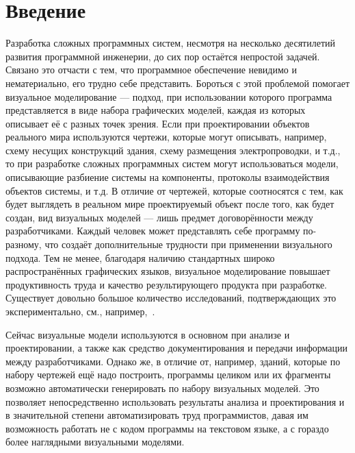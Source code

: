 \chapter*{Введение}
Разработка сложных программных систем, несмотря на несколько десятилетий 
развития программной инженерии, до сих пор остаётся непростой задачей. 
Связано это отчасти с тем, что программное обеспечение невидимо и нематериально, 
его трудно себе представить. Бороться с этой проблемой помогает визуальное 
моделирование --- подход, при использовании которого программа представляется в 
виде набора графических моделей, каждая из которых описывает её с разных точек 
зрения. Если при проектировании объектов реального мира используются чертежи, 
которые могут описывать, например, схему несущих конструкций здания, схему 
размещения электропроводки, и т.д., то при разработке сложных программных 
систем могут использоваться модели, описывающие разбиение системы на компоненты, 
протоколы взаимодействия объектов системы, и т.д. В отличие от чертежей, которые 
соотносятся с тем, как будет выглядеть в реальном мире проектируемый объект 
после того, как будет создан, вид визуальных моделей --- лишь предмет 
договорённости между разработчиками. Каждый человек может представлять себе 
программу по-разному, что создаёт дополнительные трудности при применении 
визуального подхода. Тем не менее, благодаря наличию стандартных широко 
распространённых графических языков, визуальное моделирование повышает 
продуктивность труда и качество результирующего продукта при разработке. 
Существует довольно большое количество исследований, подтверждающих это 
экспериментально, см., например,~\cite{heijstek2009empirical, baker2005model}.

Сейчас визуальные модели используются в основном при анализе и проектировании, 
а также как средство документирования и передачи информации между 
разработчиками. Однако же, в отличие от, например, зданий, которые по набору 
чертежей ещё надо построить, программы целиком или их фрагменты возможно 
автоматически генерировать по набору визуальных моделей. Это позволяет 
непосредственно использовать результаты анализа и проектирования и в 
значительной степени автоматизировать труд программистов, давая им возможность 
работать не с кодом программы на текстовом языке, а с гораздо более наглядными 
визуальными моделями. 

